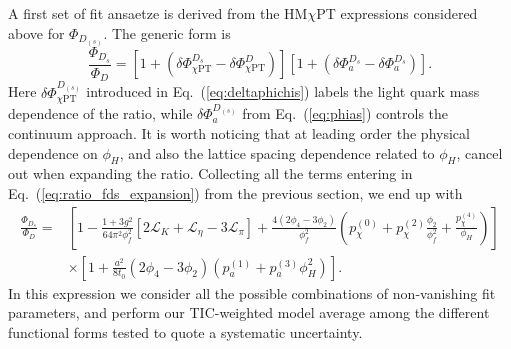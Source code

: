 A first set of fit ansaetze is derived from the HM$\chi$PT expressions considered above
for $\Phi_{D_{(s)}}$. The generic form is
\begin{equation}
	\frac{\Phi_{D_s}}{\Phi_D} = \left[
	1 + \left(
	\delta\Phi_{\chi\mathrm{PT}}^{D_s} - \delta\Phi_{\chi\mathrm{PT}}^{D}
	\right)
	\right]
	\left[
	1 + \left(
	\delta\Phi_{a}^{D_s} - \delta\Phi_{a}^{D_s}
	\right)
	\right].
	\label{eq:ratio_fds_expansion}
\end{equation}
Here $\delta\Phi_{\chi\mathrm{PT}}^{D_{(s)}}$  introduced in Eq.~(\ref{eq:deltaphichis}) labels the light quark mass dependence of the ratio, while $\delta\Phi_a^{D_{(s)}}$ from Eq.~(\ref{eq:phias}) controls the continuum approach. It is worth noticing that at leading order the physical dependence on $\phi_H$, and also the lattice spacing dependence related to $\phi_H$, cancel out when expanding the ratio.
Collecting all the terms entering in Eq.~(\ref{eq:ratio_fds_expansion}) from the previous section,
we end up with 
\begin{equation}
	\begin{split}
		\frac{\Phi_{D_s}}{\Phi_D} =&
		\left[  1 - \frac{1+3g^2}{64\pi^2 \phi_f^2} \left[ 2 \mathcal{L}_{K} + \mathcal{L}_{\eta} - 3 \mathcal{L}_{\pi} \right] 
		+ \frac{4 \left( 2\phi_4 - 3 \phi_2 \right)}{\phi_f^2}  \left( p_\chi^{(0)} +  p_\chi^{(2)} \frac{\phi_2}{\phi_f^2} + \frac{p_\chi^{(4)}}{\phi_H} \right)  \right]  
		\\
		&\times \left[ 1+ \frac{a^2}{8t_0} \left( 2 \phi_4 - 3 \phi_2 \right) \left( p_a^{(1)} + p_a^{(3)} \phi_H^2 \right)  \right]. 
		\label{eq:ratiophi}
	\end{split}
\end{equation}
In this expression we consider all the possible combinations of non-vanishing fit parameters,
and perform our TIC-weighted model average among the different functional forms tested to
quote a systematic uncertainty.  

